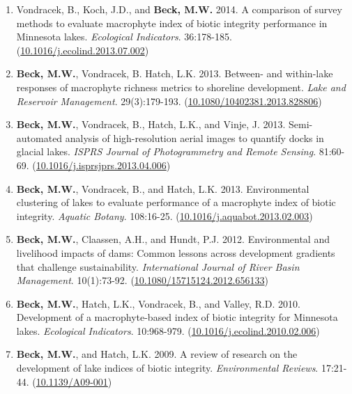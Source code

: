 \documentclass[letterpaper,12pt]{article}
\begin{document}
\begin{enumerate}
\item Vondracek, B., Koch, J.D., and \textbf{Beck, M.W.} 2014. A comparison of survey methods to evaluate macrophyte index of biotic integrity performance in Minnesota lakes. \textit{Ecological Indicators}. 36:178-185. ({\footnotesize\href{https://doi.org/10.1016/j.ecolind.2013.07.002}{10.1016/j.ecolind.2013.07.002}})

\item \textbf{Beck, M.W.}, Vondracek, B. Hatch, L.K. 2013. Between- and within-lake responses of macrophyte richness metrics to shoreline development. \textit{Lake and Reservoir Management}. 29(3):179-193. ({\footnotesize\href{http://dx.doi.org/10.1080/10402381.2013.828806}{10.1080/10402381.2013.828806}})

\item \textbf{Beck, M.W.}, Vondracek, B., Hatch, L.K., and Vinje, J. 2013. Semi-automated analysis of high-resolution aerial images to quantify docks in glacial lakes. \textit{ISPRS Journal of Photogrammetry and Remote Sensing}. 81:60-69. ({\footnotesize\href{https://doi.org/10.1016/j.isprsjprs.2013.04.006}{10.1016/j.isprsjprs.2013.04.006}})

\item \textbf{Beck, M.W.}, Vondracek, B., and Hatch, L.K. 2013. Environmental clustering of lakes to evaluate performance of a macrophyte index of biotic integrity. \textit{Aquatic Botany}. 108:16-25. ({\footnotesize\href{https://doi.org/10.1016/j.aquabot.2013.02.003}{10.1016/j.aquabot.2013.02.003}})

\item \textbf{Beck, M.W.}, Claassen, A.H., and Hundt, P.J. 2012. Environmental and livelihood impacts of dams: Common lessons across development gradients that challenge sustainability. \textit{International Journal of River Basin Management}. 10(1):73-92. ({\footnotesize\href{http://dx.doi.org/10.1080/15715124.2012.656133}{10.1080/15715124.2012.656133}})

\item \textbf{Beck, M.W.}, Hatch, L.K., Vondracek, B., and Valley, R.D. 2010. Development of a macrophyte-based index of biotic integrity for Minnesota lakes. \textit{Ecological Indicators}. 10:968-979. ({\footnotesize\href{https://doi.org/10.1016/j.ecolind.2010.02.006}{10.1016/j.ecolind.2010.02.006}})

\item \textbf{Beck, M.W.}, and Hatch, L.K. 2009. A review of research on the development of lake indices of biotic integrity. \textit{Environmental Reviews}. 17:21-44. ({\footnotesize\href{https://doi.org/10.1139/A09-001}{10.1139/A09-001}})

\end{enumerate}
\end{document}
